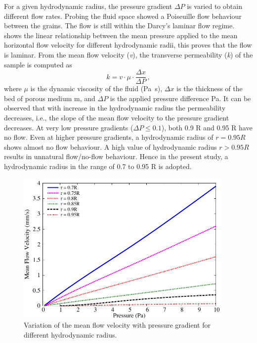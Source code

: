 For a given hydrodynamic radius, the pressure gradient $\Delta P$ is varied to 
obtain different flow rates. Probing the fluid space showed a Poiseuille flow 
behaviour between the grains. The flow is still within the Darcy's laminar flow 
regime.~ shows the linear relationship between the mean 
pressure applied to the mean horizontal flow velocity for different 
hydrodynamic radii, this proves that the flow is laminar. From the mean flow 
velocity (\textit{v}), the transverse permeability (\textit{k}) of the sample 
is computed as
%
\begin{equation}
k=v\cdot\mu\cdot\frac{\Delta x}{\Delta P} \,,
\end{equation}
%
where $\mu$ is the dynamic viscosity of the fluid (\si{\Pa\s}), $\Delta x$ is 
the thickness of the bed of porous medium \si{\m}, and $\Delta P$ is the 
applied pressure difference \si{\Pa}. It can be observed that with increase in 
the hydrodynamic radius the permeability decreases, i.e., the slope of the mean 
flow velocity to the pressure gradient decreases. At very low pressure 
gradients 
($\Delta P \le 0.1$), both 0.9 R and 0.95 R have no flow. Even at 
higher pressure gradients, a hydrodynamic radius of $r = 0.95 R$ shows almost 
no 
flow behaviour. A high value of hydrodynamic radius $r > 0.95 R$ 
results in unnatural flow/no-flow behaviour. Hence in the present study, a 
hydrodynamic radius in the range of 0.7 to 0.95 R is adopted.

\begin{figure}[htpb]
\centering
\includegraphics[width=0.95\textwidth]{Permeability}
\caption{Variation of the mean flow velocity with pressure gradient for 
different hydrodynamic radius.}
\label{fig:permeability}
\end{figure}


